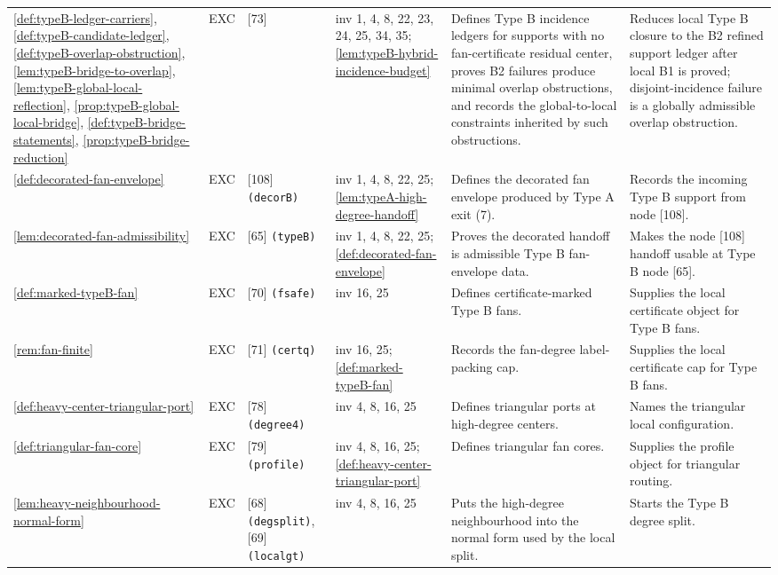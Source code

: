 \documentclass[11pt]{article}
\begin{document}
{\begin{longtable}{L{0.10\textwidth} C{0.045\textwidth} L{0.13\textwidth} L{0.135\textwidth} L{0.28\textwidth} L{0.20\textwidth}}
\cref{def:typeB-ledger-carriers}, \cref{def:typeB-candidate-ledger}, \cref{def:typeB-overlap-obstruction}, \cref{lem:typeB-bridge-to-overlap}, \cref{lem:typeB-global-local-reflection}, \cref{prop:typeB-global-local-bridge}, \cref{def:typeB-bridge-statements}, \cref{prop:typeB-bridge-reduction} & EXC & [73] & inv 1, 4, 8, 22, 23, 24, 25, 34, 35; \cref{lem:typeB-hybrid-incidence-budget} & Defines Type B incidence ledgers for supports with no fan-certificate residual center, proves B2 failures produce minimal overlap obstructions, and records the global-to-local constraints inherited by such obstructions. & Reduces local Type B closure to the B2 refined support ledger after local B1 is proved; disjoint-incidence failure is a globally admissible overlap obstruction. \\
\cref{def:decorated-fan-envelope} & EXC & [108] \texttt{(decorB)} & inv 1, 4, 8, 22, 25; \cref{lem:typeA-high-degree-handoff} & Defines the decorated fan envelope produced by Type A exit (7). & Records the incoming Type B support from node [108]. \\
\cref{lem:decorated-fan-admissibility} & EXC & [65] \texttt{(typeB)} & inv 1, 4, 8, 22, 25; \cref{def:decorated-fan-envelope} & Proves the decorated handoff is admissible Type B fan-envelope data. & Makes the node [108] handoff usable at Type B node [65]. \\
\cref{def:marked-typeB-fan} & EXC & [70] \texttt{(fsafe)} & inv 16, 25 & Defines certificate-marked Type B fans. & Supplies the local certificate object for Type B fans. \\
\cref{rem:fan-finite} & EXC & [71] \texttt{(certq)} & inv 16, 25; \cref{def:marked-typeB-fan} & Records the fan-degree label-packing cap. & Supplies the local certificate cap for Type B fans. \\
\cref{def:heavy-center-triangular-port} & EXC & [78] \texttt{(degree4)} & inv 4, 8, 16, 25 & Defines triangular ports at high-degree centers. & Names the triangular local configuration. \\
\cref{def:triangular-fan-core} & EXC & [79] \texttt{(profile)} & inv 4, 8, 16, 25; \cref{def:heavy-center-triangular-port} & Defines triangular fan cores. & Supplies the profile object for triangular routing. \\
\cref{lem:heavy-neighbourhood-normal-form} & EXC & [68] \texttt{(degsplit)}, [69] \texttt{(localgt)} & inv 4, 8, 16, 25 & Puts the high-degree neighbourhood into the normal form used by the local split. & Starts the Type B degree split. \\

\end{longtable}}
\end{document}
